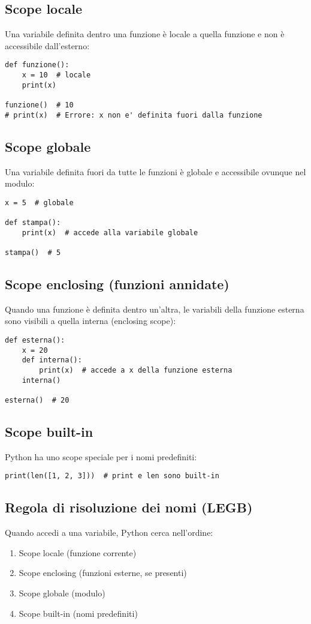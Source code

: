 \documentclass[a4paper,12pt]{article}
\begin{document}
\subsection*{Scope locale}
Una variabile definita dentro una funzione è locale a quella funzione e non è accessibile dall'esterno:
\begin{lstlisting}
def funzione():
    x = 10  # locale
    print(x)

funzione()  # 10
# print(x)  # Errore: x non e' definita fuori dalla funzione
\end{lstlisting}

\subsection*{Scope globale}
Una variabile definita fuori da tutte le funzioni è globale e accessibile ovunque nel modulo:
\begin{lstlisting}
x = 5  # globale

def stampa():
    print(x)  # accede alla variabile globale

stampa()  # 5
\end{lstlisting}

\subsection*{Scope enclosing (funzioni annidate)}
Quando una funzione è definita dentro un'altra, le variabili della funzione esterna sono visibili a quella interna (enclosing scope):
\begin{lstlisting}
def esterna():
    x = 20
    def interna():
        print(x)  # accede a x della funzione esterna
    interna()

esterna()  # 20
\end{lstlisting}

\subsection*{Scope built-in}
Python ha uno scope speciale per i nomi predefiniti:
\begin{lstlisting}
print(len([1, 2, 3]))  # print e len sono built-in
\end{lstlisting}

\subsection*{Regola di risoluzione dei nomi (LEGB)}
Quando accedi a una variabile, Python cerca nell'ordine:
\begin{enumerate}
    \item Scope locale (funzione corrente)
    \item Scope enclosing (funzioni esterne, se presenti)
    \item Scope globale (modulo)
    \item Scope built-in (nomi predefiniti)
\end{enumerate}
\end{document}
